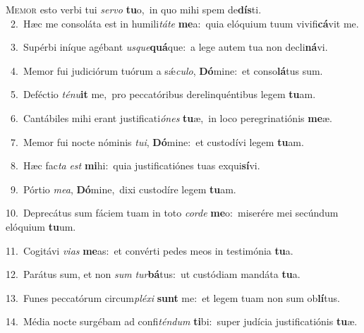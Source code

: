 \lettrine{\initial\textcolor{\initialcolor}{M}}{emor} esto verbi tui \textit{ser}\-\textit{vo} \textbf{tu}\-o,~\star in quo mihi spem de\-\textbf{dís}\-ti.\\
{\numbfont\textcolor{\numbcolor}{~2.}}~Hæc me consoláta est in humili\-\textit{tá}\-\textit{te} \textbf{me}\-a:~\star quia elóquium tuum vivifi\-\textbf{cá}\-vit me.\par
{\numbfont\textcolor{\numbcolor}{~3.}}~Supérbi iníque agébant \textit{us}\-\textit{que}\textbf{quá}que:~\star a lege autem tua non decli\-\textbf{ná}\-vi.\par
{\numbfont\textcolor{\numbcolor}{~4.}}~Memor fui judiciórum tuórum a sǽ\-\textit{cu}\-\textit{lo}, \textbf{Dó}\-mine:~\star et conso\-\textbf{lá}\-tus sum.\par
{\numbfont\textcolor{\numbcolor}{~5.}}~Deféctio \textit{té}\-\textit{nu}\textbf{it} me,~\star pro peccatóribus derelinquéntibus legem \textbf{tu}\-am.\par
{\numbfont\textcolor{\numbcolor}{~6.}}~Cantábiles mihi erant justificati\-\textit{ó}\-\textit{nes} \textbf{tu}\-æ,~\star in loco peregrinatiónis \textbf{me}\-æ.\par
{\numbfont\textcolor{\numbcolor}{~7.}}~Memor fui nocte nóminis \textit{tu}\-\textit{i}, \textbf{Dó}\-mine:~\star et custodívi legem \textbf{tu}\-am.\par
{\numbfont\textcolor{\numbcolor}{~8.}}~Hæc fac\textit{ta} \textit{est} \textbf{mi}\-hi:~\star quia justificatiónes tuas exqui\-\textbf{sí}\-vi.\par
{\numbfont\textcolor{\numbcolor}{~9.}}~Pórtio \textit{me}\-\textit{a}, \textbf{Dó}\-mine,~\star dixi custodíre legem \textbf{tu}\-am.\par
{\numbfont\textcolor{\numbcolor}{10.}}~Deprecátus sum fáciem tuam in toto \textit{cor}\-\textit{de} \textbf{me}\-o:~\star miserére mei secúndum elóquium \textbf{tu}\-um.\par
{\numbfont\textcolor{\numbcolor}{11.}}~Cogitávi \textit{vi}\-\textit{as} \textbf{me}\-as:~\star et convérti pedes meos in testimónia \textbf{tu}\-a.\par
{\numbfont\textcolor{\numbcolor}{12.}}~Parátus sum, et non \textit{sum} \textit{tur}\-\textbf{bá}tus:~\star ut custódiam mandáta \textbf{tu}\-a.\par
{\numbfont\textcolor{\numbcolor}{13.}}~Funes peccatórum circum\-\textit{plé}\-\textit{xi} \textbf{sunt} me:~\star et legem tuam non sum ob\-\textbf{lí}\-tus.\par
{\numbfont\textcolor{\numbcolor}{14.}}~Média nocte surgébam ad confi\-\textit{tén}\-\textit{dum} \textbf{ti}\-bi:~\star super judícia justificatiónis \textbf{tu}\-æ.\par
